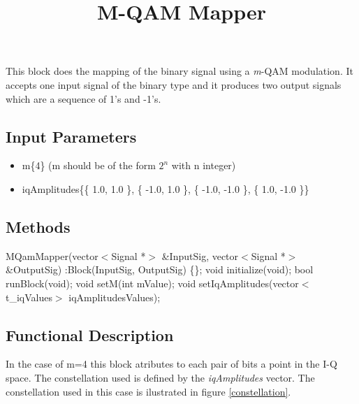 \documentclass[a4paper]{article}
\title{M-QAM Mapper}
\begin{document}
	
\maketitle

This block does the mapping of the binary signal using a \textit{m}-QAM modulation. It accepts one input signal of the binary type and it produces two output signals which are a sequence of 1's and -1's.

\subsection*{Input Parameters}

\begin{itemize}
	\item m\{4\} \linebreak
	(m should be of the form $2^n$ with n integer)
	\item iqAmplitudes\{\{ 1.0, 1.0 \}, \{ -1.0, 1.0 \}, \{ -1.0, -1.0 \}, \{ 1.0, -1.0 \}\} \linebreak
	
\end{itemize}

\subsection*{Methods}

MQamMapper(vector$<$Signal *$>$ \&InputSig, vector$<$Signal *$>$ \&OutputSig) :Block(InputSig, OutputSig) \{\};
\bigbreak	
void initialize(void);
\bigbreak	
bool runBlock(void);
\bigbreak	
void setM(int mValue);
\bigbreak	
void setIqAmplitudes(vector$<$t\_iqValues$>$ iqAmplitudesValues);

\subsection*{Functional Description}

In the case of m=4 this block atributes to each pair of bits a point in the I-Q space. The constellation used is defined by the \textit{iqAmplitudes} vector. The constellation used in this case is ilustrated in figure \ref{constellation}.
\end{document}
